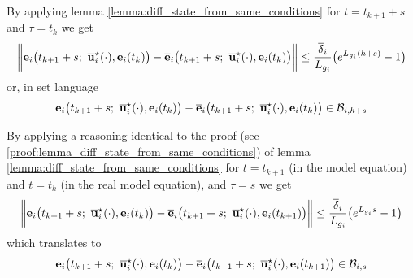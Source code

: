 \begin{gg_box}
By applying lemma \eqref{lemma:diff_state_from_same_conditions} for
$t=t_{k+1} + s$ and $\tau=t_k$ we get
\begin{align}
    \bigg\|
      \vect{e}_i\big(t_{k+1}+s;\  \overline{\vect{u}}_i^{\star}(\cdot), \vect{e}_i(t_k)\big)
      -\overline{\vect{e}}_i\big(t_{k+1} + s;\ \overline{\vect{u}}_i^{\star}(\cdot), \vect{e}_i(t_k)\big)
    \bigg\|
    \leq \dfrac{\overline{\delta}_i}{L_{g_i}}\big(e^{L_{g_i} (h+s)}-1\big)
\end{align}
or, in set language
\begin{align}
      \vect{e}_i\big(t_{k+1}+s;\  \overline{\vect{u}}_i^{\star}(\cdot), \vect{e}_i(t_k)\big)
      -\overline{\vect{e}}_i\big(t_{k+1} + s;\ \overline{\vect{u}}_i^{\star}(\cdot), \vect{e}_i(t_k)\big)
      \in \mathcal{B}_{i, h+s}
\end{align}

By applying a reasoning identical to the proof
(see \eqref{proof:lemma_diff_state_from_same_conditions}) of lemma
\eqref{lemma:diff_state_from_same_conditions} for $t=t_{k+1}$ (in the model
equation) and $t = t_k$ (in the real model equation), and $\tau = s$ we get
\begin{align}
    \bigg\|
      \vect{e}_i\big(t_{k+1}+s;\  \overline{\vect{u}}_i^{\star}(\cdot), \vect{e}_i(t_k)\big)
      -\overline{\vect{e}}_i\big(t_{k+1} + s;\ \overline{\vect{u}}_i^{\star}(\cdot), \vect{e}_i(t_{k+1})\big)
    \bigg\|
  \leq \dfrac{\overline{\delta}_i}{L_{g_i}}\big(e^{L_{g_i} s}-1\big)
\end{align}
which translates to
\begin{align}
      \vect{e}_i\big(t_{k+1}+s;\  \overline{\vect{u}}_i^{\star}(\cdot), \vect{e}_i(t_k)\big)
      -\overline{\vect{e}}_i\big(t_{k+1} + s;\ \overline{\vect{u}}_i^{\star}(\cdot), \vect{e}_i(t_{k+1})\big)
      \in \mathcal{B}_{i,s}
\end{align}


\end{gg_box}
